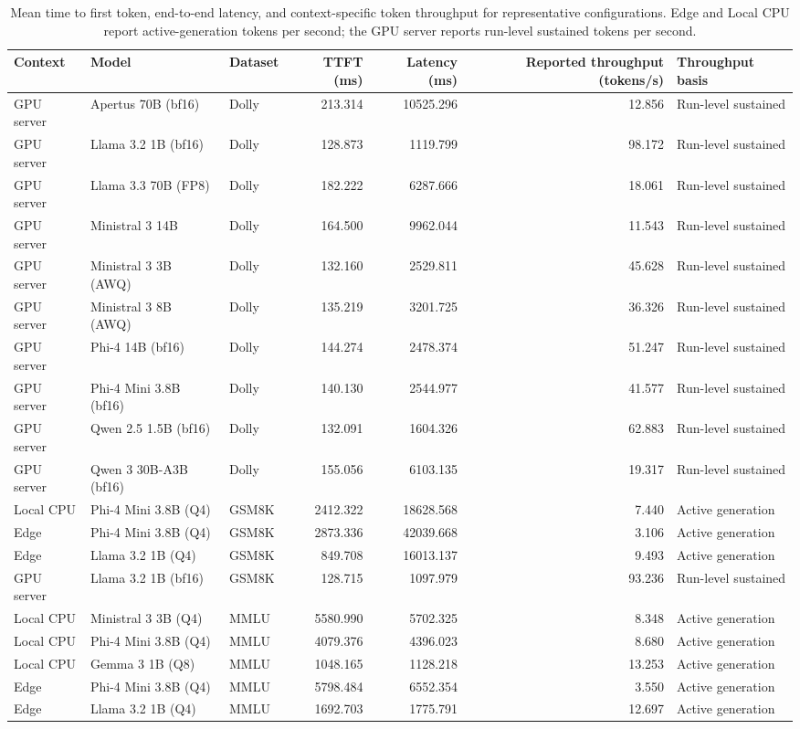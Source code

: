 \begin{table}[t]
\centering
\caption{Mean time to first token, end-to-end latency, and context-specific token throughput for representative configurations. Edge and Local CPU report active-generation tokens per second; the GPU server reports run-level sustained tokens per second.}
\label{tab:timing-throughput}
\scriptsize
\setlength{\tabcolsep}{3.2pt}
\renewcommand{\arraystretch}{1.08}
\begin{tabularx}{\textwidth}{@{}lLLrrrL@{}}
\toprule
\textbf{Context} & \textbf{Model} & \textbf{Dataset} & \textbf{TTFT (ms)} & \textbf{Latency (ms)} & \textbf{Reported throughput (tokens/s)} & \textbf{Throughput basis} \\
\midrule
GPU server & Apertus 70B (bf16) & Dolly & 213.314 & 10525.296 & 12.856 & Run-level sustained \\
GPU server & Llama 3.2 1B (bf16) & Dolly & 128.873 & 1119.799 & 98.172 & Run-level sustained \\
GPU server & Llama 3.3 70B (FP8) & Dolly & 182.222 & 6287.666 & 18.061 & Run-level sustained \\
GPU server & Ministral 3 14B & Dolly & 164.500 & 9962.044 & 11.543 & Run-level sustained \\
GPU server & Ministral 3 3B (AWQ) & Dolly & 132.160 & 2529.811 & 45.628 & Run-level sustained \\
GPU server & Ministral 3 8B (AWQ) & Dolly & 135.219 & 3201.725 & 36.326 & Run-level sustained \\
GPU server & Phi-4 14B (bf16) & Dolly & 144.274 & 2478.374 & 51.247 & Run-level sustained \\
GPU server & Phi-4 Mini 3.8B (bf16) & Dolly & 140.130 & 2544.977 & 41.577 & Run-level sustained \\
GPU server & Qwen 2.5 1.5B (bf16) & Dolly & 132.091 & 1604.326 & 62.883 & Run-level sustained \\
GPU server & Qwen 3 30B-A3B (bf16) & Dolly & 155.056 & 6103.135 & 19.317 & Run-level sustained \\
Local CPU & Phi-4 Mini 3.8B (Q4) & GSM8K & 2412.322 & 18628.568 & 7.440 & Active generation \\
Edge & Phi-4 Mini 3.8B (Q4) & GSM8K & 2873.336 & 42039.668 & 3.106 & Active generation \\
Edge & Llama 3.2 1B (Q4) & GSM8K & 849.708 & 16013.137 & 9.493 & Active generation \\
GPU server & Llama 3.2 1B (bf16) & GSM8K & 128.715 & 1097.979 & 93.236 & Run-level sustained \\
Local CPU & Ministral 3 3B (Q4) & MMLU & 5580.990 & 5702.325 & 8.348 & Active generation \\
Local CPU & Phi-4 Mini 3.8B (Q4) & MMLU & 4079.376 & 4396.023 & 8.680 & Active generation \\
Local CPU & Gemma 3 1B (Q8) & MMLU & 1048.165 & 1128.218 & 13.253 & Active generation \\
Edge & Phi-4 Mini 3.8B (Q4) & MMLU & 5798.484 & 6552.354 & 3.550 & Active generation \\
Edge & Llama 3.2 1B (Q4) & MMLU & 1692.703 & 1775.791 & 12.697 & Active generation \\
\bottomrule
\end{tabularx}
\end{table}
